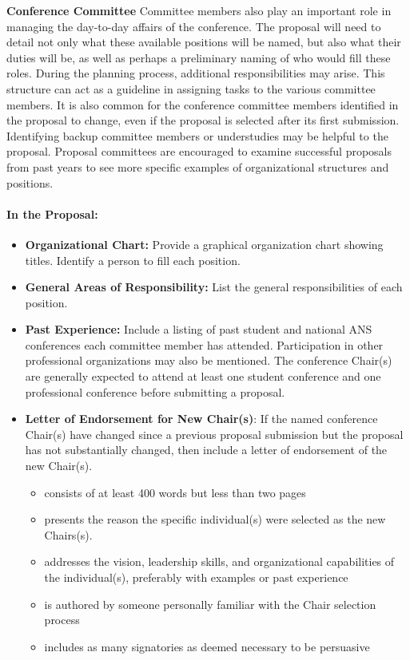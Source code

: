 \documentclass[12pt]{article}
\begin{document}
\textbf{Conference Committee} Committee members also play an important role in managing the day-to-day affairs of the conference. The proposal will need to detail not only what these available positions will be named, but also what their duties will be, as well as perhaps a preliminary naming of who would fill these roles. During the planning process, additional responsibilities may arise. This structure can act as a guideline in assigning tasks to the various committee members.
It is also common for the conference committee members identified in the proposal to
change, even if the proposal is selected after its first submission. Identifying backup committee
members or understudies may be helpful to the proposal.
Proposal committees are encouraged to examine successful proposals from past years to see more specific examples of organizational structures and positions.

\paragraph{In the Proposal:}
\begin{itemize}
\item{\textbf{Organizational Chart:} Provide a graphical organization chart showing titles.
Identify a person to fill each position.}
\item{\textbf{General Areas of Responsibility:} List the general responsibilities of each
position.}
\item{\textbf{Past Experience:} Include a listing of past student and national ANS conferences
each committee member has attended. Participation in other professional
organizations may also be mentioned. The conference Chair(s) are generally expected to attend at least one student conference and one professional conference before submitting a proposal.}
\item{\textbf{Letter of Endorsement for New Chair(s)}: If the named conference Chair(s)
have changed since a previous proposal submission but the proposal has not
substantially changed, then include a letter of endorsement of the new Chair(s).
\begin{itemize}
\item{consists of at least 400 words but less than two pages}
\item{presents the reason the specific individual(s) were selected as the new Chairs(s).}
\item{addresses the vision, leadership skills, and organizational capabilities of the
individual(s), preferably with examples or past experience}
\item{is authored by someone personally familiar with the Chair selection process}
\item{includes as many signatories as deemed necessary to be persuasive}
\end{itemize}
}
\end{itemize}
\end{document}
